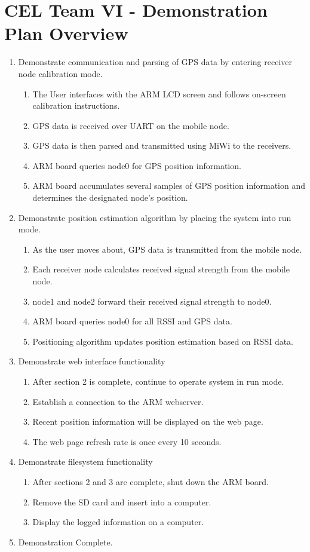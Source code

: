 \documentclass[10pt,letterpaper]{article}
\begin{document}
\section*{CEL Team VI - Demonstration Plan Overview}
\begin{enumerate}
\item Demonstrate communication and parsing of GPS data by entering receiver node calibration mode.
	\begin{enumerate}
	\item The User interfaces with the ARM LCD screen and follows on-screen calibration instructions.
	\item GPS data is received over UART on the mobile node.
	\item GPS data is then parsed and transmitted using MiWi to the receivers.
	\item ARM board queries node0 for GPS position information.
	\item ARM board accumulates several samples of GPS position information and determines the designated node's position.
	\end{enumerate}
\item Demonstrate position estimation algorithm by placing the system into run mode.
	\begin{enumerate}
	\item As the user moves about, GPS data is transmitted from the mobile node.
	\item Each receiver node calculates received signal strength from the mobile node.
	\item node1 and node2 forward their received signal strength to node0.
	\item ARM board queries node0 for all RSSI and GPS data.
	\item Positioning algorithm updates position estimation based on RSSI data.
	\end{enumerate}
\item Demonstrate web interface functionality
	\begin{enumerate}
	\item After section 2 is complete, continue to operate system in run mode.
	\item Establish a connection to the ARM webserver.
	\item Recent position information will be displayed on the web page.
	\item The web page refresh rate is once every 10 seconds.
	\end{enumerate}
\item Demonstrate filesystem functionality
	\begin{enumerate}
	\item After sections 2 and 3 are complete, shut down the ARM board.
	\item Remove the SD card and insert into a computer.
	\item Display the logged information on a computer.
	\end{enumerate}
\item Demonstration Complete.
\end{enumerate}
\end{document}
